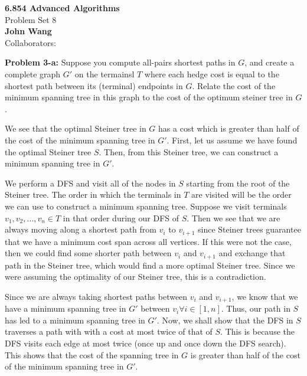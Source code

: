 \documentclass[psamsfonts]{amsart}
\newenvironment{sol}{\vspace{0.25cm}{\large \bfseries Solution:}}{\qedsymbol}
\newenvironment{prob}[1]{\begin{framed}{\large \bfseries Problem #1:}}{\end{framed}}
\newcommand{\makenewtitle}{
    \begin{center}
    {\huge \bfseries 6.854 Advanced Algorithms} \\
    Problem Set 8\\
    \vspace{0.25cm}
    {\bfseries John Wang} \\
    Collaborators:  
    \end{center}
    \vspace{0.5cm}
}
\begin{document}
\newpage
\makenewtitle

\begin{prob}{3-a}
Suppose you compute all-pairs shortest paths in $G$, and create a complete graph $G'$ on the termainsl $T$ where each hedge cost is equal to the shortest path between its (terminal) endpoints in $G$. Relate the cost of the minimum spanning tree in this graph to the cost of the optimum steiner tree in $G$. 
\end{prob}
\begin{sol}
We see that the optimal Steiner tree in $G$ has a cost which is greater than half of the cost of the minimum spanning tree in $G'$. First, let us assume we have found the optimal Steiner tree $S$. Then, from this Steiner tree, we can construct a minimum spanning tree in $G'$. 

We perform a DFS and visit all of the nodes in $S$ starting from the root of the Steiner tree. The order in which the terminals in $T$ are visited will be the order we can use to construct a minimum spanning tree. Suppose we visit terminals $v_1, v_2, \ldots, v_n \in T$ in that order during our DFS of $S$. Then we see that we are always moving along a shortest path from $v_i$ to $v_{i+1}$ since Steiner trees guarantee that we have a minimum cost span across all vertices. If this were not the case, then we could find some shorter path between $v_i$ and $v_{i+1}$ and exchange that path in the Steiner tree, which would find a more optimal Steiner tree. Since we were assuming the optimality of our Steiner tree, this is a contradiction. 

Since we are always taking shortest paths between $v_{i}$ and $v_{i+1}$, we know that we have a minimum spanning tree in $G'$ between $v_{i} \forall i \in [1, n]$. Thus, our path in $S$ has led to a minimum spanning tree in $G'$. Now, we shall show that the DFS in $S$ traverses a path with with a cost at most twice of that of $S$. This is because the DFS visits each edge at most twice (once up and once down the DFS search). This shows that the cost of the spanning tree in $G$ is greater than half of the cost of the minimum spanning tree in $G'$. 
\end{sol}
\end{document}
